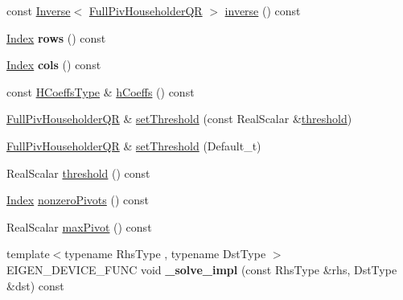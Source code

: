 \begin{DoxyCompactItemize}
const \hyperlink{class_eigen_1_1_inverse}{Inverse}$<$ \hyperlink{group___q_r___module_class_eigen_1_1_full_piv_householder_q_r}{Full\+Piv\+Householder\+QR} $>$ \hyperlink{group___q_r___module_a352ce66397af06da214ddde343cec6f5}{inverse} () const
\item 
\mbox{\label{group___q_r___module_a3b3fd394100b72f5979060b34b94ff01}} 
\hyperlink{namespace_eigen_a62e77e0933482dafde8fe197d9a2cfde}{Index} {\bfseries rows} () const
\item 
\mbox{\label{group___q_r___module_a1849e6c9ba23dfeeaa00f2480d43f826}} 
\hyperlink{namespace_eigen_a62e77e0933482dafde8fe197d9a2cfde}{Index} {\bfseries cols} () const
\item 
const \hyperlink{class_eigen_1_1internal_1_1_tensor_lazy_evaluator_writable}{H\+Coeffs\+Type} \& \hyperlink{group___q_r___module_a874fcd822871010f7961d9e94f1767e4}{h\+Coeffs} () const
\item 
\hyperlink{group___q_r___module_class_eigen_1_1_full_piv_householder_q_r}{Full\+Piv\+Householder\+QR} \& \hyperlink{group___q_r___module_a92277e572bf98245891015d12dd2b602}{set\+Threshold} (const Real\+Scalar \&\hyperlink{group___q_r___module_af7f6ac15ca19c2b9e45dc3eaae58c201}{threshold})
\item 
\hyperlink{group___q_r___module_class_eigen_1_1_full_piv_householder_q_r}{Full\+Piv\+Householder\+QR} \& \hyperlink{group___q_r___module_aaea4bf3dd145e0cddb16e364cca9d887}{set\+Threshold} (Default\+\_\+t)
\item 
Real\+Scalar \hyperlink{group___q_r___module_af7f6ac15ca19c2b9e45dc3eaae58c201}{threshold} () const
\item 
\hyperlink{namespace_eigen_a62e77e0933482dafde8fe197d9a2cfde}{Index} \hyperlink{group___q_r___module_af1e4d04824084a964c1a6e51db68376f}{nonzero\+Pivots} () const
\item 
Real\+Scalar \hyperlink{group___q_r___module_a7887506237a3bf912aebc9aaa8edacec}{max\+Pivot} () const
\item 
\mbox{\label{group___q_r___module_ada7941201fde2fd566f8d6050fea6c2e}} 
{\footnotesize template$<$typename Rhs\+Type , typename Dst\+Type $>$ }\\E\+I\+G\+E\+N\+\_\+\+D\+E\+V\+I\+C\+E\+\_\+\+F\+U\+NC void {\bfseries \+\_\+solve\+\_\+impl} (const Rhs\+Type \&rhs, Dst\+Type \&dst) const
\item 

\end{DoxyCompactItemize}
